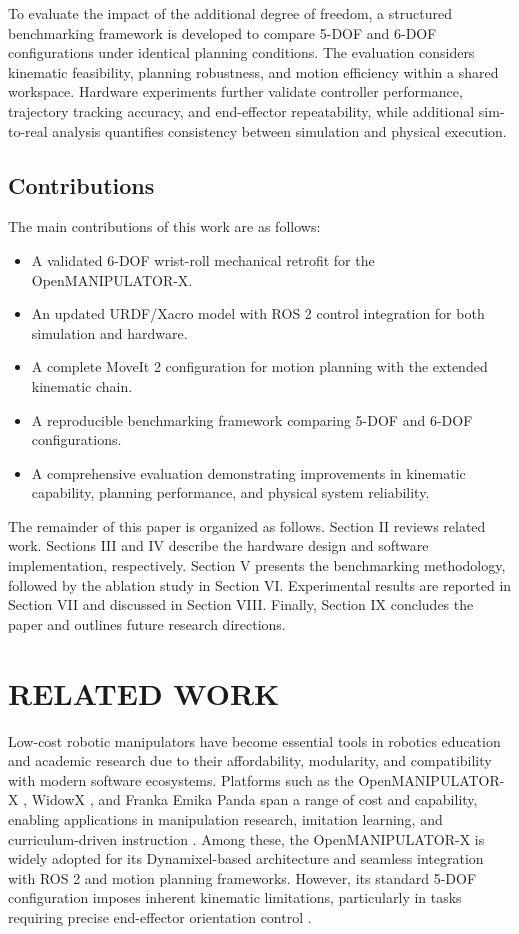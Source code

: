 \documentclass[conference]{IEEEtran}
\begin{document}
	To evaluate the impact of the additional degree of freedom, a structured benchmarking framework is developed to compare 5-DOF and 6-DOF configurations under identical planning conditions. The evaluation considers kinematic feasibility, planning robustness, and motion efficiency within a shared workspace. Hardware experiments further validate controller performance, trajectory tracking accuracy, and end-effector repeatability, while additional sim-to-real analysis quantifies consistency between simulation and physical execution.
	
	\subsection*{Contributions}
	The main contributions of this work are as follows:
	
	\begin{itemize}
		\item A validated 6-DOF wrist-roll mechanical retrofit for the OpenMANIPULATOR-X.
		\item An updated URDF/Xacro model with ROS 2 control integration for both simulation and hardware.
		\item A complete MoveIt 2 configuration for motion planning with the extended kinematic chain.
		\item A reproducible benchmarking framework comparing 5-DOF and 6-DOF configurations.
		\item A comprehensive evaluation demonstrating improvements in kinematic capability, planning performance, and physical system reliability.
	\end{itemize}


	The remainder of this paper is organized as follows. Section II reviews related work. Sections III and IV describe the hardware design and software implementation, respectively. Section V presents the benchmarking methodology, followed by the ablation study in Section VI. Experimental results are reported in Section VII and discussed in Section VIII. Finally, Section IX concludes the paper and outlines future research directions.


	\section{RELATED WORK}
    
		Low-cost robotic manipulators have become essential tools in robotics education and academic research due to their affordability, modularity, and compatibility with modern software ecosystems. Platforms such as the OpenMANIPULATOR-X , WidowX , and Franka Emika Panda span a range of cost and capability, enabling applications in manipulation research, imitation learning, and curriculum-driven instruction . Among these, the OpenMANIPULATOR-X is widely adopted for its Dynamixel-based architecture and seamless integration with ROS 2 and motion planning frameworks. However, its standard 5-DOF configuration imposes inherent kinematic limitations, particularly in tasks requiring precise end-effector orientation control .
		
\end{document}
